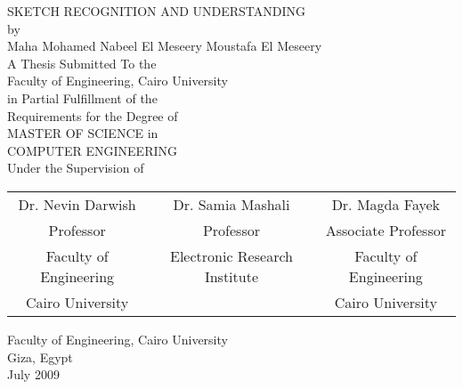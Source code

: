 \documentclass[11pt,doublespace]{SketchThesis}
\begin{document}
\newpage    
\thispagestyle{empty}               %
 \begin{center}     
 SKETCH RECOGNITION AND UNDERSTANDING\\
\normalsize by      \\ 
  Maha Mohamed Nabeel El Meseery Moustafa El Meseery\\
\vspace*{0.4in}        
\normalsize
A Thesis Submitted To the\\
Faculty of Engineering, Cairo University\\
in Partial Fulfillment of the\\
Requirements for the Degree of\\
MASTER OF SCIENCE
in\\
COMPUTER ENGINEERING\\
\vspace*{0.4in} 
Under the Supervision of 
\end{center}
  \vspace*{0.4in} 
\begin{center}
 		\begin{tabular}{ccc}
		Dr. Nevin Darwish  & Dr. Samia Mashali & Dr. Magda Fayek \\
		 Professor   & Professor & Associate Professor  \\
		 Faculty of Engineering& Electronic Research Institute & 		 Faculty of Engineering \\
		  Cairo University && Cairo University\\
		\end{tabular}
\end{center}
  \vspace*{0.4in}       
  \vfill
\begin{center}
   Faculty of Engineering, Cairo University \\ Giza, Egypt \\ July 2009
\end{center}
 
\newpage       
\thispagestyle{empty}               %
 
\end{document}
